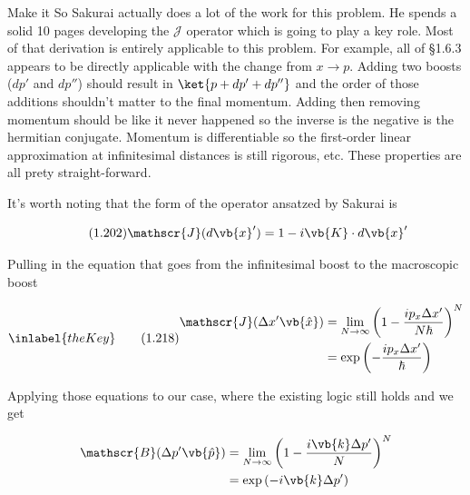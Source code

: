 \begin{answer}
  \begin{answerpart}{Make it So}
    Sakurai actually does a lot of the work for this problem.  He
    spends a solid 10 pages developing the $\mathscr{J}$ operator
    which is going to play a key role.  Most of that derivation is
    entirely applicable to this problem.  For example, all of \S1.6.3
    appears to be directly applicable with the change from $x
    \rightarrow p$.  Adding two boosts ($dp'$ and $dp''$) should
    result in $\ket{p + dp' + dp''}$ and the order of those additions
    shouldn't matter to the final momentum.  Adding then removing
    momentum should be like it never happened so the inverse is the
    negative is the hermitian conjugate.  Momentum is differentiable
    so the first-order linear approximation at infinitesimal distances
    is still rigorous, etc.  These properties are all prety
    straight-forward.

    It's worth noting that the form of the operator ansatzed by
    Sakurai is

    \begin{equation}
      \tag{1.202}
      \mathscr{J}(d\vb{x}') = 1 - i\vb{K} \cdot d\vb{x}'
    \end{equation}

    Pulling in the equation that goes from the infinitesimal boost to
    the macroscopic boost

    \begin{equation}
      \inlabel{theKey}
      \tag{1.218}
      \begin{split}
        \mathscr{J}(\Delta x'\vb{\hat{x}})
        &= \lim_{N \rightarrow \infty}
        \left(
        1 - \frac{ip_x\Delta x'}{N\hbar}
        \right)^N
        \\
        &= \exp
        \left(
        -\frac{ip_x\Delta x'}{\hbar}
        \right)
        \\
      \end{split}
    \end{equation}

    Applying those equations to our case, where the existing logic
    still holds and we get

    \begin{equation}
      \begin{split}
        \mathscr{B}(\Delta p'\vb{\hat{p}})
        &= \lim_{N \rightarrow \infty}
        \left(
        1 - \frac{i\vb{k}\Delta p'}{N}
        \right)^N
        \\
        &= \exp
        \left(
        -i\vb{k}\Delta p'
        \right)
        \\
      \end{split}
    \end{equation}


\end{answerpart}
\end{answer}
